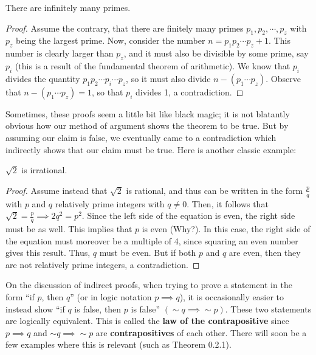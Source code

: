 \begin{theorem}
    There are infinitely many primes.
\end{theorem}
\vspace{-3.5mm}
\begin{proof}
    Assume the contrary, that there are finitely many primes $p_1, p_2, \cdots, p_z$ with $p_z$ being the largest prime. Now, consider the number $n=p_1p_2\cdots p_z +1$. This number is clearly larger than $p_z$, and it must also be divisible by some prime, say $p_i$ (this is a result of the fundamental theorem of arithmetic). We know that $p_i$ divides the quantity $p_1p_2\cdots p_i\cdots p_z$, so it must also divide $n-(p_1\cdots p_z)$. Observe that $n-(p_1\cdots p_z)=1$, so that $p_i$ divides 1, a contradiction.  
\end{proof}

Sometimes, these proofs seem a little bit like black magic; it is not blatantly obvious how our method of argument shows the theorem to be true. But by assuming our claim is false, we eventually came to a contradiction which indirectly shows that our claim must be true. Here is another classic example:

\begin{theorem}
    $\sqrt{2}$ is irrational.
\end{theorem}
\begin{proof}
    Assume instead that $\sqrt{2}$ is rational, and thus can be written in the form $\frac{p}{q}$ with $p$ and $q$ relatively prime integers with $q\neq 0$. Then, it follows that $\sqrt{2}=\frac{p}{q}\implies 2q^2=p^2$. Since the left side of the equation is even, the right side must be as well. This implies that $p$ is even (Why?). In this case, the right side of the equation must moreover be a multiple of 4, since squaring an even number gives this result. Thus, $q$ must be even. But if both $p$ and $q$ are even, then they are not relatively prime integers, a contradiction. 
\end{proof}

On the discussion of indirect proofs, when trying to prove a statement in the form ``if $p$, then $q$'' (or in logic notation $p\implies q$), it is occasionally easier to instead show ``if $q$ is false, then $p$ is false'' $(\sim q\implies \sim p)$. These two statements are logically equivalent. This is called the \textbf{law of the contrapositive} since $p\implies q$ and $\sim q \implies \sim p$ are \textbf{contrapositives} of each other. There will soon be a few examples where this is relevant (such as Theorem 0.2.1). \\

